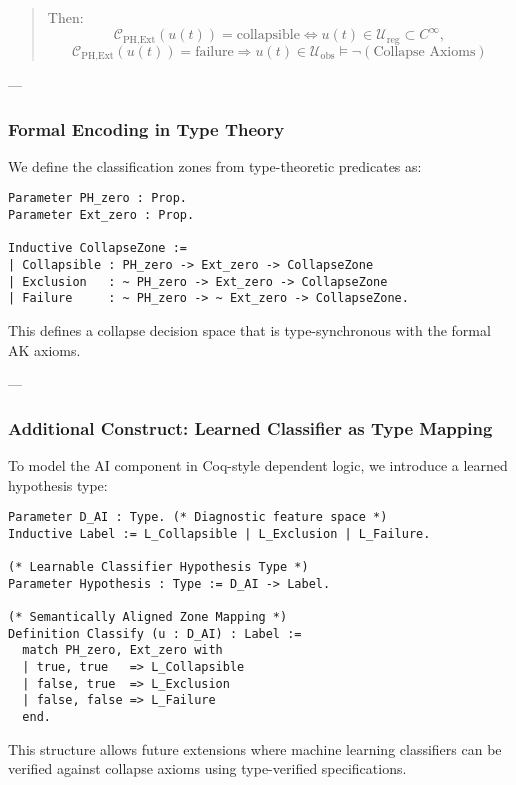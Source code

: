 \documentclass[11pt]{article}
\begin{document}
\begin{axiom}
\begin{axiom}
{{\begin{quote}
Then:
\[
\mathcal{C}_{\text{PH,Ext}}(u(t)) = \text{collapsible} \Leftrightarrow u(t) \in \mathcal{U}_{\mathrm{reg}} \subset C^\infty,
\]
\[
\mathcal{C}_{\text{PH,Ext}}(u(t)) = \text{failure} \Rightarrow u(t) \in \mathcal{U}_{\mathrm{obs}} \models \neg(\text{Collapse Axioms})
\]
\end{quote}

---

\subsubsection*{Formal Encoding in Type Theory}

We define the classification zones from type-theoretic predicates as:

\begin{lstlisting}[language=Coq, caption=Collapse Zone Typing via PH and Ext Flags]
Parameter PH_zero : Prop.
Parameter Ext_zero : Prop.

Inductive CollapseZone :=
| Collapsible : PH_zero -> Ext_zero -> CollapseZone
| Exclusion   : ~ PH_zero -> Ext_zero -> CollapseZone
| Failure     : ~ PH_zero -> ~ Ext_zero -> CollapseZone.
\end{lstlisting}

This defines a collapse decision space that is type-synchronous with the formal AK axioms.

---

\subsubsection*{Additional Construct: Learned Classifier as Type Mapping}

To model the AI component in Coq-style dependent logic, we introduce a learned hypothesis type:

\begin{lstlisting}[language=Coq, caption=Classifier Hypothesis Type and Mapping]
Parameter D_AI : Type. (* Diagnostic feature space *)
Inductive Label := L_Collapsible | L_Exclusion | L_Failure.

(* Learnable Classifier Hypothesis Type *)
Parameter Hypothesis : Type := D_AI -> Label.

(* Semantically Aligned Zone Mapping *)
Definition Classify (u : D_AI) : Label :=
  match PH_zero, Ext_zero with
  | true, true   => L_Collapsible
  | false, true  => L_Exclusion
  | false, false => L_Failure
  end.
\end{lstlisting}

This structure allows future extensions where machine learning classifiers can be verified  
against collapse axioms using type-verified specifications.

}}
\end{axiom}
\end{axiom}
\end{document}
